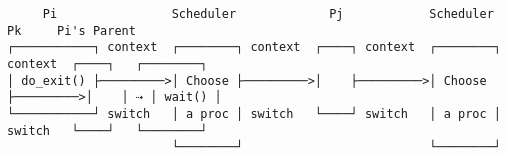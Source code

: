 \documentclass[varwidth=70em,crop]{standalone}
\begin{document}
\begin{verbatim}
     Pi                Scheduler             Pj            Scheduler             Pk     Pi's Parent
┌───────────┐ context  ┌────────┐ context  ┌────┐ context  ┌────────┐ context  ┌────┐   ┌────────┐
│ do_exit() ├─────────>│ Choose ├─────────>│    ├─────────>│ Choose ├─────────>│    │ ⇢ │ wait() │
└───────────┘ switch   │ a proc │ switch   └────┘ switch   │ a proc │ switch   └────┘   └────────┘
                       └────────┘                          └────────┘
\end{verbatim}
\end{document}
